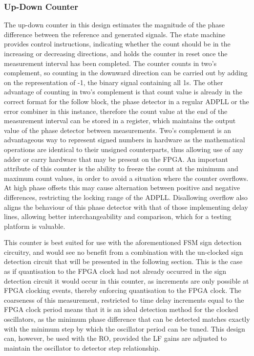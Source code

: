 \subsubsection{Up-Down Counter}
The up-down counter in this design estimates the magnitude of the phase difference between the reference and generated signals. The state machine provides control instructions, indicating whether the count should be in the increasing or decreasing directions, and holds the counter in reset once the measurement interval has been completed. The counter counts in two's complement, so counting in the downward direction can be carried out by adding on the representation of -1, the binary signal containing all 1s. The other advantage of counting in two's complement is that count value is already in the correct format for the follow block, the phase detector in a regular \ac{ADPLL} or the error combiner in this instance, therefore the count value at the end of the measurement interval can be stored in a register, which maintains the output value of the phase detector between measurements. Two's complement is an advantageous way to represent signed numbers in hardware as the mathematical operations are identical to their unsigned counterparts, thus allowing use of any adder or carry hardware that may be present on the \ac{FPGA}. An important attribute of this counter is the ability to freeze the count at the minimum and maximum count values, in order to avoid a situation where the counter overflows. At high phase offsets this may cause alternation between positive and negative differences, restricting the locking range of the \ac{ADPLL}. Disallowing overflow also aligns the behaviour of this phase detector with that of those implementing delay lines, allowing better interchangeability and comparison, which for a testing platform is valuable.

This counter is best suited for use with the aforementioned \ac{FSM} sign detection circuitry, and would see no benefit from a combination with the un-clocked sign detection circuit that will be presented in the following section. This is the case as if quantisation to the \ac{FPGA} clock had not already occurred in the sign detection circuit it would occur in this counter, as increments are only possible at \ac{FPGA} clocking events, thereby enforcing quantisation to the \ac{FPGA} clock. The coarseness of this measurement, restricted to time delay increments equal to the \ac{FPGA} clock period means that it is an ideal detection method for the clocked oscillators, as the minimum phase difference that can be detected matches exactly with the minimum step by which the oscillator period can be tuned. This design can, however, be used with the \acl{RO}, provided the \acl{LF} gains are adjusted to maintain the oscillator to detector step relationship.

